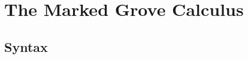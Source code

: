 \section{The Marked Grove Calculus}
\label{sec:marked-calculus}


\subsection{Syntax}
\label{sec:marked-syntax}



